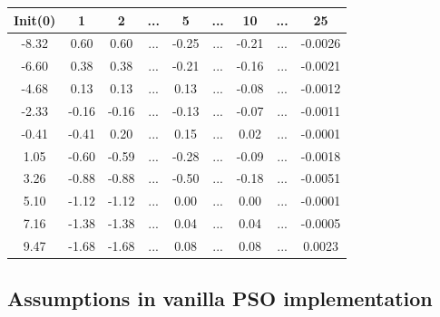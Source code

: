 \documentclass{article}
\begin{document}
\begin{center}
\begin{tabular}{ |c|c|c|c|c|c|c|c|c| } 

\hline
Init(0) & 1 & 2 & ... & 5 & ... & 10 & ... & 25\\
\hline
-8.32 &  0.60 &  0.60 & ... & -0.25 & ... &  -0.21 & ... & -0.0026\\ 
-6.60 &  0.38 &  0.38 & ... & -0.21 & ... &  -0.16 & ... & -0.0021\\  
-4.68 &  0.13 &  0.13 & ... &  0.13 & ... &  -0.08 & ... & -0.0012\\  
-2.33 & -0.16 & -0.16 & ... & -0.13 & ... &  -0.07 & ... & -0.0011\\ 
-0.41 & -0.41 &  0.20 & ... &  0.15 & ... &   0.02 & ... & -0.0001\\  
 1.05 & -0.60 & -0.59 & ... & -0.28 & ... &  -0.09 & ... & -0.0018\\ 
 3.26 & -0.88 & -0.88 & ... & -0.50 & ... &  -0.18 & ... & -0.0051\\ 
 5.10 & -1.12 & -1.12 & ... &  0.00 & ... &   0.00 & ... & -0.0001\\  
 7.16 & -1.38 & -1.38 & ... &  0.04 & ... &   0.04 & ... & -0.0005\\ 
 9.47 & -1.68 & -1.68 & ... &  0.08 & ... &   0.08 & ... &  0.0023\\ 
\hline
\end{tabular}
\end{center}

\subsection{Assumptions in vanilla PSO implementation}
\end{document}
